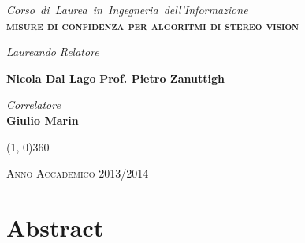 \documentclass[12pt]{report}
\newcommand{\ThesisTitle}{misure di confidenza per algoritmi di \newline stereo vision}
\newcommand{\nullpage}{\newpage\null\thispagestyle{empty}}  %
\begin{document}
\begin{titlepage}
\begin{center}
			\vspace{1.5cm}
			\emph{\Large{Corso~di~Laurea~in~Ingegneria~dell'Informazione}} \\
			
			\vspace{1.5cm}
			\scshape{\Large{\bfseries{\ThesisTitle}}} \\
			
		\end{center}

		\vfill
		\begin{normalsize}
			\begin{flushleft}
  				\hspace{83pt} \textit{Laureando} \hspace{142pt} \textit{Relatore}\\
  				\vspace{5pt}
  
  				\hspace{62pt} \large{\textbf{Nicola Dal Lago}} \hspace{71pt} \large{\textbf{Prof. Pietro Zanuttigh}}\\
			\end{flushleft}
		\end{normalsize}
		
		\begin{normalsize}
			\begin{flushleft}
		  				\hspace{276pt} \textit{Correlatore}\\
		  
		  				\vspace{5pt}
		  				\hspace{266pt} \large{\textbf{Giulio Marin}}\\
			\end{flushleft}
		\end{normalsize}
		\vfill
		
		\begin{center}
			\hspace{-0.2cm}
			\line(1, 0){360}

			\textsc{Anno Accademico 2013/2014}
		\end{center}
 	\end{titlepage}


	\nullpage                      %

	\chapter*{Abstract}
	\label{sec:Abstract}
	\pagestyle{fancy}
	
\end{document}
